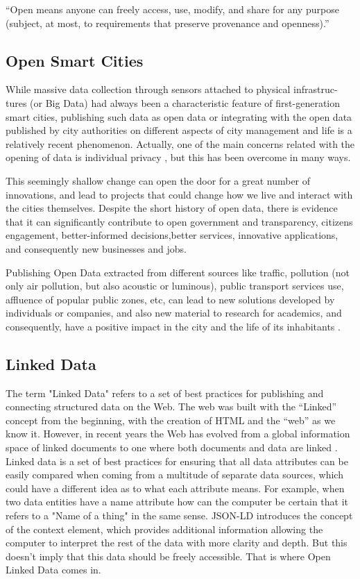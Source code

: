 “Open means anyone can freely access, use, modify, and share for any purpose (subject, at most, to requirements that preserve provenance and openness).” \cite{what-is-open}

\subsection{Open Smart Cities}

While massive data collection through sensors attached to physical infrastruc-tures (or Big Data) had always been a characteristic feature of first-generation smart cities, publishing such data as open data or integrating with the open data published by city authorities on different aspects of city management and life is a relatively recent phenomenon. Actually, one of the main concerns related with the opening of data is individual privacy \cite{CONRADIE2014S10}, but this has been overcome in many ways. 

This seemingly shallow change can open the door for a great number of innovations, and lead to projects that could change how we live and interact with the cities themselves. Despite the short history of open data, there is evidence that it can significantly contribute to open government and transparency, citizens engagement, better-informed decisions,better services, innovative applications, and consequently new businesses and jobs.

Publishing Open Data extracted from different sources like traffic, pollution (not only air pollution, but also acoustic or luminous), public transport services use, affluence of popular public zones, etc, can lead to new solutions developed by individuals or companies, and also new material to research for academics, and consequently, have a positive impact in the city and the life of its inhabitants \cite{ojo2015tale}.

\subsection{Linked Data}

The term "Linked Data" refers to a set of best practices for publishing and connecting structured data on the Web. The web was built with the “Linked” concept from the beginning, with the creation of HTML and the “web” as we know it. However, in recent years the Web has evolved from a global information space of linked documents to one where both documents and data are linked \cite{bizer2011linked}.
Linked data is a set of best practices for ensuring that all data attributes can be easily compared when coming from a multitude of separate data sources, which could have a different idea as to what each attribute means. For example, when two data entities have a name attribute how can the computer be certain that it refers to a "Name of a thing" in the same sense. JSON-LD  introduces the concept of the context element, which provides additional information allowing the computer to interpret the rest of the data with more clarity and depth. But this doesn’t imply that this data should be freely accessible. That is where Open Linked Data comes in. 

